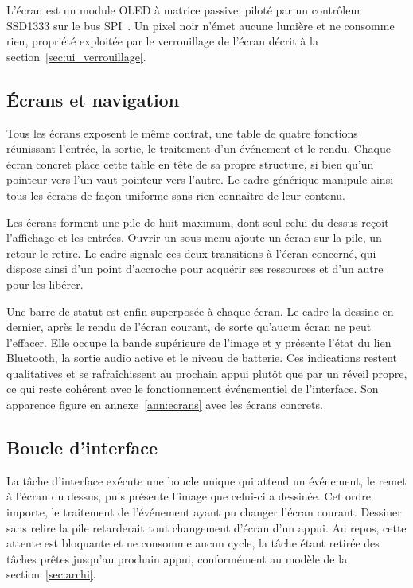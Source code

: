 L'écran est un module OLED à matrice passive, piloté par un contrôleur SSD1333 sur le bus SPI~\cite{NHD-1.91-176176UBC3}. Un pixel noir n'émet aucune lumière et ne consomme rien, propriété exploitée par le verrouillage de l'écran décrit à la section~\ref{sec:ui_verrouillage}.

\subsection{Écrans et navigation}

Tous les écrans exposent le même contrat, une table de quatre fonctions réunissant l'entrée, la sortie, le traitement d'un événement et le rendu. Chaque écran concret place cette table en tête de sa propre structure, si bien qu'un pointeur vers l'un vaut pointeur vers l'autre. Le cadre générique manipule ainsi tous les écrans de façon uniforme sans rien connaître de leur contenu.

Les écrans forment une pile de huit maximum, dont seul celui du dessus reçoit l'affichage et les entrées. Ouvrir un sous-menu ajoute un écran sur la pile, un retour le retire. Le cadre signale ces deux transitions à l'écran concerné, qui dispose ainsi d'un point d'accroche pour acquérir ses ressources et d'un autre pour les libérer.

Une barre de statut est enfin superposée à chaque écran. Le cadre la dessine en dernier, après le rendu de l'écran courant, de sorte qu'aucun écran ne peut l'effacer. Elle occupe la bande supérieure de l'image et y présente l'état du lien Bluetooth, la sortie audio active et le niveau de batterie. Ces indications restent qualitatives et se rafraîchissent au prochain appui plutôt que par un réveil propre, ce qui reste cohérent avec le fonctionnement événementiel de l'interface. Son apparence figure en annexe~\ref{ann:ecrans} avec les écrans concrets.

\subsection{Boucle d'interface}

La tâche d'interface exécute une boucle unique qui attend un événement, le remet à l'écran du dessus, puis présente l'image que celui-ci a dessinée. Cet ordre importe, le traitement de l'événement ayant pu changer l'écran courant. Dessiner sans relire la pile retarderait tout changement d'écran d'un appui. Au repos, cette attente est bloquante et ne consomme aucun cycle, la tâche étant retirée des tâches prêtes jusqu'au prochain appui, conformément au modèle de la section~\ref{sec:archi}.

